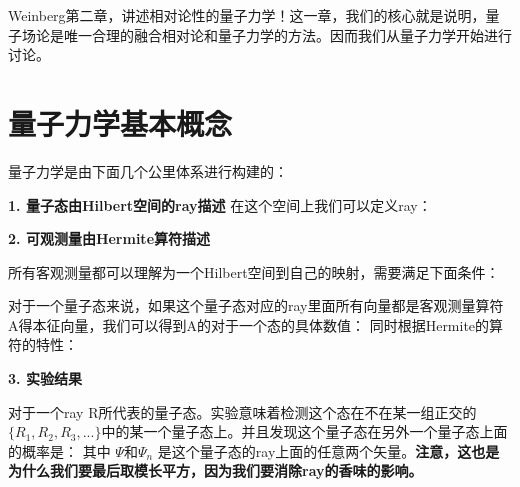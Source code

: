Weinberg第二章，讲述相对论性的量子力学！这一章，我们的核心就是说明，量子场论是唯一合理的融合相对论和量子力学的方法。因而我们从量子力学开始进行讨论。    

\section{量子力学基本概念}
量子力学是由下面几个公里体系进行构建的：
\bigskip

\textbf{1. 量子态由Hilbert空间的ray描述}
在这个空间上我们可以定义ray：

\textbf{2. 可观测量由Hermite算符描述}

所有客观测量都可以理解为一个Hilbert空间到自己的映射，需要满足下面条件：

对于一个量子态来说，如果这个量子态对应的ray里面所有向量都是客观测量算符A得本征向量，我们可以得到A的对于一个态的具体数值：
同时根据Hermite的算符的特性：

\textbf{3. 实验结果}

对于一个ray R所代表的量子态。实验意味着检测这个态在不在某一组正交的 $ \{R_1,R_2,R_3,...\} $中的某一个量子态上。并且发现这个量子态在另外一个量子态上面的概率是：
其中 $ \Psi $和$ \Psi_n $ 是这个量子态的ray上面的任意两个矢量。\textbf{注意，这也是为什么我们要最后取模长平方，因为我们要消除ray的香味的影响。} 

